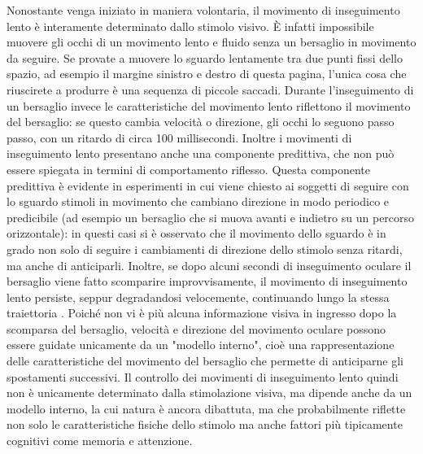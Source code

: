 \documentclass[12pt]{article}
\begin{document}
Nonostante venga iniziato in maniera volontaria, il movimento di inseguimento lento è interamente determinato dallo stimolo visivo. È infatti impossibile muovere gli occhi di un movimento lento e fluido senza un bersaglio in movimento da seguire. Se provate a muovere lo sguardo lentamente tra due punti fissi dello spazio, ad esempio il margine sinistro e destro di questa pagina, l'unica cosa che riuscirete a produrre è una sequenza di piccole saccadi. Durante l'inseguimento di un bersaglio invece le caratteristiche del movimento lento riflettono il movimento del bersaglio: se questo cambia velocità o direzione, gli occhi lo seguono passo passo, con un ritardo di circa 100 millisecondi. Inoltre i movimenti di inseguimento lento presentano anche una componente predittiva, che non può essere spiegata in termini di comportamento riflesso. Questa componente predittiva è evidente in esperimenti in cui viene chiesto ai soggetti di seguire con lo sguardo stimoli in movimento che cambiano direzione in modo periodico e predicibile (ad esempio un bersaglio che si muova avanti e indietro su un percorso orizzontale): in questi casi si è osservato che il movimento dello sguardo è in grado non solo di seguire i cambiamenti di direzione dello stimolo senza ritardi, ma anche di anticiparli. Inoltre, se dopo alcuni secondi di inseguimento oculare il bersaglio viene fatto scomparire improvvisamente, il movimento di inseguimento lento persiste, seppur degradandosi velocemente, continuando lungo la stessa traiettoria \cite{Whittaker1982}. Poiché non vi è più alcuna informazione visiva in ingresso dopo la scomparsa del bersaglio, velocità e direzione del movimento oculare possono essere guidate unicamente da un "modello interno", cioè una rappresentazione delle caratteristiche del movimento del bersaglio che permette di anticiparne gli spostamenti successivi. Il controllo dei movimenti di inseguimento lento quindi non è unicamente determinato dalla stimolazione visiva, ma dipende anche da un modello interno, la cui natura è ancora dibattuta, ma che probabilmente riflette non solo le caratteristiche fisiche dello stimolo ma anche fattori più tipicamente cognitivi come memoria e attenzione.
\end{document}
